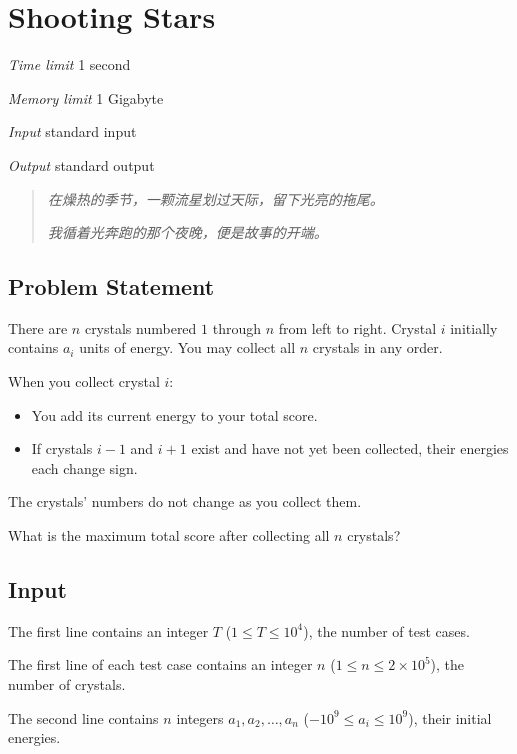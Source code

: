 \section[I. Shooting Stars]{ Shooting Stars}

\textit{Time limit}   1 second

\textit{Memory limit} 1 Gigabyte

\textit{Input} \qquad standard input

\textit{Output} \qquad standard output


\begin{quote}
	\textit{在燥热的季节，一颗流星划过天际，留下光亮的拖尾。}
	
	\textit{我循着光奔跑的那个夜晚，便是故事的开端。}
\end{quote}

\subsection{Problem Statement}

There are $n$ crystals numbered $1$ through $n$ from left to right. Crystal $i$ initially contains $a_i$ units of energy. You may collect all $n$ crystals in any order.

When you collect crystal $i$:

\begin{itemize}
	\item You add its current energy to your total score.
	\item If crystals $i-1$ and $i+1$ exist and have not yet been collected, their energies each change sign.
\end{itemize}

The crystals' numbers do not change as you collect them.

What is the maximum total score after collecting all $n$ crystals?

\subsection{Input}

The first line contains an integer $T$ ($1 \le T \le 10^4$), the number of test cases.

The first line of each test case contains an integer $n$ ($1 \le n \le 2 \times 10^5$), the number of crystals.

The second line contains $n$ integers $a_1,a_2,\ldots,a_n$ ($-10^9 \le a_i \le 10^9$), their initial energies.

